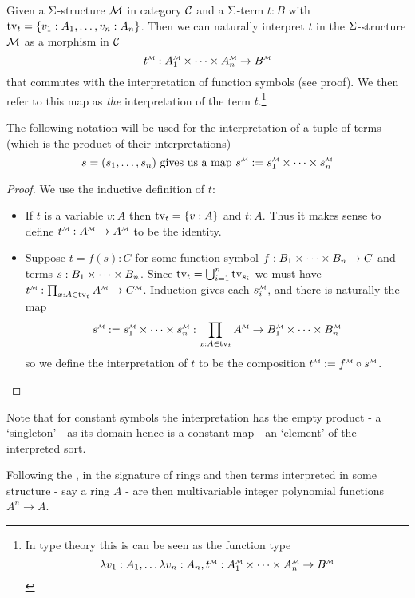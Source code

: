\begin{dfn}
    Given a $\Sigma$-structure $\mathcal{M}$ in category $\mathcal{C}$ and a $\Sigma$-term 
    $t : B$ with 
    $\textrm{tv}_{t} = \left\{v_1 : A_1, \dots, v_n : A_n\right\}$.
    Then we can naturally interpret $t$ in the $\Sigma$-structure $\mathcal{M}$ as a 
    morphism in $\mathcal{C}$
    \[
        \mmintp{t} : \mmintp{A_1} \tdt \mmintp{A_n} \to \mmintp{B}
    \]
    that commutes with the interpretation of function symbols
    (see proof).
    We then refer to this map as \emph{the} 
    interpretation of the term $t$.\footnote{
        In type theory this is can be seen as the function type
        \[
            \la v_1 : A_1, \dots \la v_n : A_n, \mmintp{t} : 
            \mmintp{A_1} \tdt \mmintp{A_n} \to \mmintp{B}
        \]}

    The following notation will be used for the interpretation of a tuple 
    of terms (which is the product of their interpretations)
    \[
        s = (s_1,\dots,s_n) \text{ gives us a map }\mmintp{s} 
        := \mmintp{s_1} \tdt \mmintp{s_n}
    \]
\end{dfn}
\begin{proof}
    We use the inductive definition of $t$:
    \begin{itemize} 
        \item If $t$ is a variable $v : A$
        then $\textrm{tv}_{t} = \left\{v : A\right\}$ and $t : A$.
        Thus it makes sense to define $\mmintp{t} : \mmintp{A} \to \mmintp{A}$ 
        to be the identity.
        \item Suppose $t = f(s) : C$ for some function symbol 
        $f : B_1 \times \dots \times B_n \to C$ and terms
        $s : B_1 \times \dots \times B_n$. 
        Since 
        $\textrm{tv}_{t} = \bigcup_{i=1}^n \textrm{tv}_{s_i}$
        we must have 
        $\mmintp{t} : \prod_{x : A \in \tv{t}} \mmintp{A} \to \mmintp{C}$. 
        Induction gives each $\mmintp{s_i}$, 
        and there is naturally the map 
        \[
            \mmintp{s} := \mmintp{s_1} \tdt \mmintp{s_n} : 
            \prod_{x : A \in \tv{t}} 
            \mmintp{A} \to \mmintp{B_1} \tdt \mmintp{B_n}
        \]
        so we define the interpretation of $t$
        to be the composition $\mmintp{t} := \mmintp{f} \circ \mmintp{s}$.
    \end{itemize}
\end{proof}
Note that for constant symbols the interpretation has the empty product 
- a `singleton' - as its domain hence is a constant map -
an `element' of the interpreted sort.

\begin{eg}
    Following the , 
    in the signature of rings
    and then terms interpreted in some structure - say a ring $A$ - 
    are then multivariable integer polynomial functions
    $A^n \to A$.
\end{eg}

